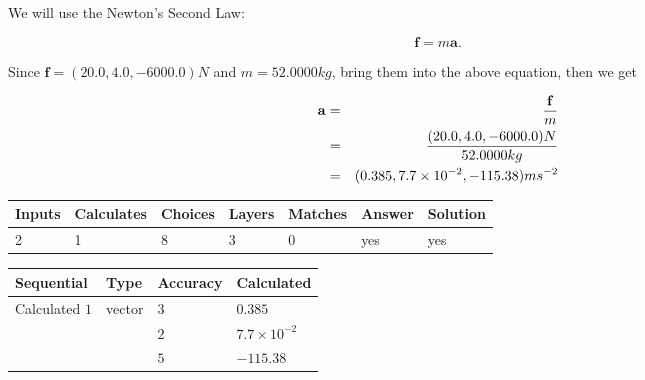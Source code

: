\documentclass[12pt]{article}
\begin{document}
 
\noindent{}
 
 

We will use the Newton's Second Law:
 
\[
\mathbf{f}=m\mathbf{a}.
\]
 
Since $\mathbf{f}= %
(20.0 , 4.0 , -6000.0) N$
and $m= %
52.0000kg$, bring them into the above equation, then we get
 
\begin{eqnarray*}
\mathbf{a}&=&\frac{\mathbf{f}}m  \\
&=&\frac{ %
(20.0 , 4.0 , -6000.0) N}{ %
52.0000kg}  \\
&=& %
(0.385 , 7.7 \times 10^{-2} , -115.38) ms^{-2}
\end{eqnarray*}
 
 
 
\noindent{}
 
 

 
\vspace{0.3in}
   
   
   
   
\noindent\begin{tabular}{|l|l|l|l|l|l|l|}
 \hline
Inputs & Calculates & Choices & Layers & Matches & Answer & Solution \\ \hline
           2  & 
           1  & 
           8
  & 
           3  & 
           0  & 
  yes & 
  yes 
  \\ \hline
 \end{tabular}
   
   
   
   
\noindent{}
   
   
  
  
\noindent\begin{tabular}{|l|l|l|l|}
\hline
 Sequential & Type & Accuracy & Calculated \\ 
\hline
 
 
  Calculated $            1 $ & vector &  
  $            3  $ 
 &  $ 0.385 $ 
 \\    
  & & 
  $            2  $ 
 &  $ 7.7 \times 10^{-2} $ 
 \\    
  & & 
  $            5  $ 
 &  $ -115.38 $ 
 \\  \hline  
 \end{tabular}
   
\end{document}
